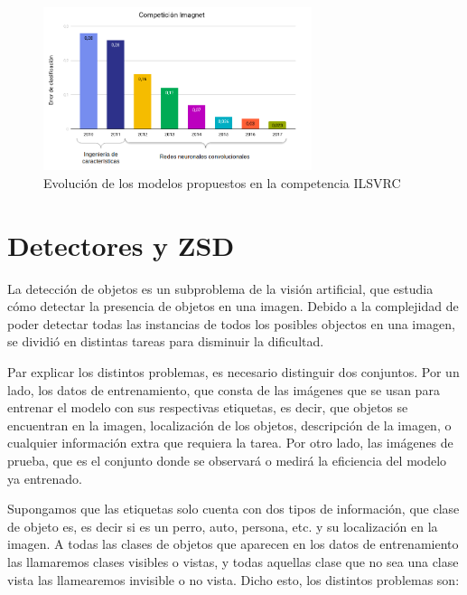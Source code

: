 \begin{figure}[H]
	\centering
	\includegraphics[width=0.7\textwidth]{img/imgnet-grafico.png}
	\caption{Evolución de los modelos propuestos en la competencia ILSVRC}
	\label{fig:EvolucionILSVRC}
\end{figure}

\section{Detectores y ZSD} \label{sec:detectoresyzsd}
La detección de objetos es un subproblema de la visión artificial, que estudia cómo detectar la presencia de objetos en una imagen. Debido a la complejidad de poder detectar todas las instancias de todos los posibles objectos en una imagen, se dividió en distintas tareas para disminuir la dificultad. 

Par explicar los distintos problemas, es necesario distinguir dos conjuntos. Por un lado, los datos de entrenamiento, que consta de las imágenes que se usan para entrenar el modelo con sus respectivas etiquetas, es decir, que objetos se encuentran en la imagen, localización de los objetos, descripción de la imagen, o cualquier información extra que requiera la tarea. Por otro lado, las imágenes de prueba, que es el conjunto donde se observará o medirá la eficiencia del modelo ya entrenado. 

Supongamos que las etiquetas solo cuenta con dos tipos de información, que clase de objeto es, es decir si es un perro, auto, persona, etc. y su localización en la imagen. A todas las clases de objetos que aparecen en los datos de entrenamiento las llamaremos clases visibles o vistas, y todas aquellas clase que no sea una clase vista las llamearemos invisible o no vista. Dicho esto, los distintos problemas son:

